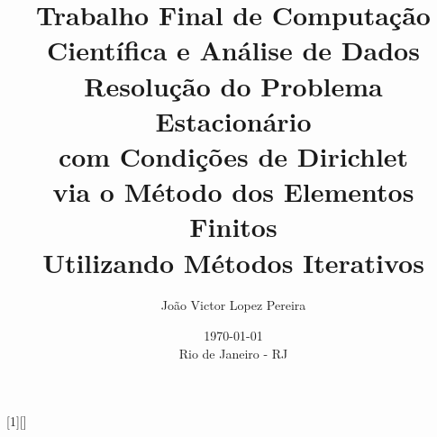 \usepackage[brazil]{babel}
\usepackage[utf8]{inputenc}
\usepackage[T1]{fontenc}

\usepackage{graphicx}
\usepackage{float}

\usepackage{tocloft}
\usepackage{hyperref}
\usepackage{csquotes}
\usepackage[backend=biber]{biblatex}

\graphicspath{{figures/}}

\usepackage{cancel}
\usepackage[top=1in, bottom=1in, left=0.5in, right=0.5in]{geometry}
\usepackage{amsmath, amssymb}
\usepackage{fancyvrb}
\usepackage{upquote}
\usepackage{indentfirst}
\usepackage{listings}
\setlength{\parskip}{\baselineskip}
\setlength{\footnotesep}{0.8em}
\setlength{\skip\footins}{2em}
\setlength{\cftbeforechapskip}{12pt}
\setlength{\cftbeforesecskip}{6pt}
\setlength{\jot}{10pt}

\title{
  Trabalho Final de Computação \\
  Científica e Análise de Dados\\
  \vspace{1cm}
  Resolução do Problema Estacionário \\
  com Condições de Dirichlet \\
  via o Método dos Elementos Finitos \\
  Utilizando Métodos Iterativos
}

\date{
  \today\\
  \vfill
  Rio de Janeiro - RJ
}

\author{
  João Victor Lopez Pereira
}


[1][]{
  \lstset{
    basicstyle=\ttfamily,
    columns=flexible,
    breaklines=true,
    breakatwhitespace=true,
    frame=none,
    basewidth=0.5em,
    aboveskip=13pt,
    belowskip=0pt,
    #1
  }
}{}

